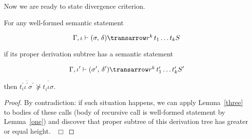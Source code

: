 Now we are ready to state divergence criterion.

\begin{theorem}
\normalfont
For any well-formed semantic statement 

$$
\otrans{\Gamma,\iota}{(\sigma,\,\delta)}{r^k\,t_1\dots t_k}{S}
$$ 

if its proper derivation subtree has a semantic statement 

$$
\otrans{\Gamma,\iota^\prime}{(\sigma^\prime,\,\delta^\prime)}{r^k\,t^\prime_1\dots t^\prime_k}{S^\prime}
$$

then $\overline{t^\prime_i \iota^\prime \sigma^\prime} \not \succeq \overline{t^{\phantom{\prime}}_i \iota \sigma}$. 
\end{theorem}
\begin{proof}
By contradiction: if such situation happens, we can apply Lemma~\ref{three} to bodies of these calls (body of recursive call is well-formed statement by Lemma~\ref{one}) and discover that proper subtree of this derivation tree has greater or equal height. ~$\Box$
\end{proof} 
